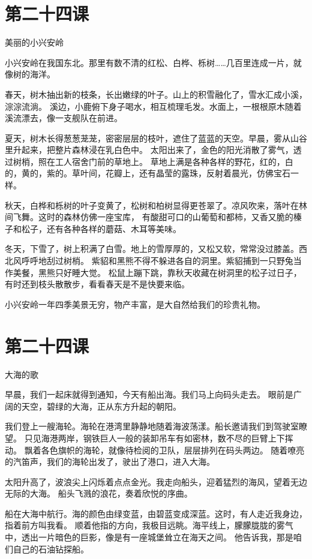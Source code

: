 \documentclass[12pt,UTF8]{ctexbook}
\begin{document}
\section{第二十四课}

美丽的小兴安岭

小兴安岭在我国东北。那里有数不清的红松、白桦、栎树……几百里连成一片，就像树的海洋。

春天，树木抽出新的枝条，长出嫩绿的叶子。山上的积雪融化了，雪水汇成小溪，淙淙流淌。
溪边，小鹿俯下身子喝水，相互梳理毛发。水面上，一根根原木随着溪流漂去，像一支舰队在前进。

夏天，树木长得葱葱茏茏，密密层层的枝叶，遮住了蓝蓝的天空。早晨，雾从山谷里升起来，把整片森林浸在乳白色中。
太阳出来了，金色的阳光消散了雾气，透过树梢，照在工人宿舍门前的草地上。
草地上满是各种各样的野花，红的，白的，黄的，紫的。草叶间，花瓣上，还有晶莹的露珠，反射着晨光，仿佛宝石一样。

秋天，白桦和栎树的叶子变黄了，松树和柏树显得更苍翠了。凉风吹来，落叶在林间飞舞。这时的森林仿佛一座宝库，
有酸甜可口的山葡萄和都柿，又香又脆的榛子和松子，还有各种各样的蘑菇、木耳等美味。

冬天，下雪了，树上积满了白雪。地上的雪厚厚的，又松又软，常常没过膝盖。西北风呼呼地刮过树梢。
紫貂和黑熊不得不躲进各自的洞里。紫貂捕到一只野兔当作美餐，黑熊只好睡大觉。
松鼠上蹦下跳，靠秋天收藏在树洞里的松子过日子，有时还到枝头散散步，看看春天是不是快要来临。

小兴安岭一年四季美景无穷，物产丰富，是大自然给我们的珍贵礼物。

\section{第二十四课}

大海的歌

早晨，我们一起床就得到通知，今天有船出海。我们马上向码头走去。
眼前是广阔的天空，碧绿的大海，正从东方升起的朝阳。

我们登上一艘海轮。海轮在港湾里静静地随着海波荡漾。船长邀请我们到驾驶室瞭望。
只见海港两岸，钢铁巨人一般的装卸吊车有如密林，数不尽的巨臂上下挥动。
飘着各色旗帜的海轮，就像待检阅的卫队，层层排列在码头两边。
随着嘹亮的汽笛声，我们的海轮出发了，驶出了港口，进入大海。

太阳升高了，波浪尖上闪烁着点点金光。我走向船头，迎着猛烈的海风，望着无边无际的大海。
船头飞溅的浪花，奏着欣悦的序曲。

船在大海中航行。海的颜色由绿变蓝，由碧蓝变成深蓝。这时，有人走近我身边，指着前方叫我看。
顺着他指的方向，我极目远眺。海平线上，朦朦胧胧的雾气中，透出一片暗色的巨影，像是有一座城堡耸立在海天之间。
他告诉我，那是咱们自己的石油钻探船。
\end{document}
